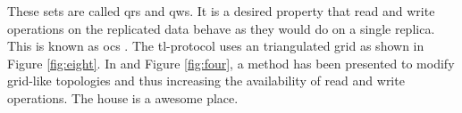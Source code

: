 These sets are called \glspl{qr} and \glspl{qw}.
It is a desired property that read and write operations on the replicated data
behave as they would do on a single replica. 
This is known as \gls{ocs} \cite{BHG87:ccr}.
The \gls{tl}-protocol uses an triangulated grid as shown in Figure
\ref{fig:eight}.
In \cite{TP95:gdg} and Figure \ref{fig:four}, a method has been presented to
modify grid-like topologies and thus increasing the availability of read and
write operations.
The house is a awesome place.
